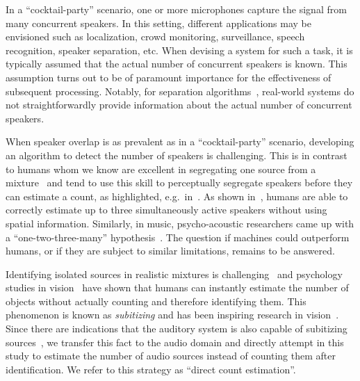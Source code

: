 In a ``cocktail-party'' scenario, one or more microphones capture the signal from many concurrent speakers. In this setting, different applications may be envisioned such as localization, crowd monitoring, surveillance, speech recognition, speaker separation, etc.
When devising a system for such a task, it is typically assumed that the actual number of concurrent speakers is known.
This assumption turns out to be of paramount importance for the effectiveness of subsequent processing.
Notably, for separation algorithms~\cite{common10},
real-world systems do not straightforwardly provide information about the actual number of concurrent speakers.
\par
When speaker overlap is as prevalent as in a ``cocktail-party'' scenario, developing an algorithm to detect the number of speakers is challenging.
This is in contrast to humans whom we know are excellent in segregating one source from a mixture~\cite{bregman} and tend to use this skill to perceptually segregate speakers before they can estimate a count, as highlighted, e.g.\ in~\cite{kawashima15}.
As shown in~\cite{kashino96, kawashima15}, humans are able to correctly estimate up to three simultaneously active speakers without using spatial information.
Similarly, in music, psycho-acoustic researchers came up with a ``one-two-three-many'' hypothesis~\cite{huron89, stoeter13, schoeffler13}.
The question if machines could outperform humans, or if they are subject to similar limitations, remains to be answered.
%
\par
Identifying isolated sources in realistic mixtures is challenging~\cite{bregman} and psychology studies in vision~\cite{jevons1871} have shown that humans can instantly estimate the number of objects without actually counting and therefore identifying them.
This phenomenon is known as \textit{subitizing} and has been inspiring research in vision~\cite{chattopadhyay17}.
Since there are indications that the auditory system is also capable of subitizing sources~\cite{hoopen79}, we transfer this fact to the audio domain and directly attempt in this study to estimate the number of audio sources instead of counting them after identification.
We refer to this strategy as ``direct count estimation''.


